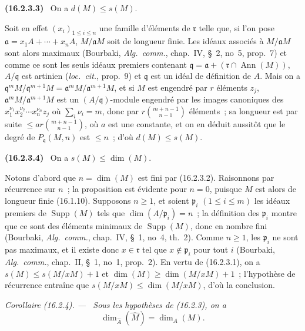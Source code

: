 \documentclass[10pt,oneside]{book}
\makeatletter
\newcommand{\setmanualcurrentlabel}[1]{\def\@currentlabel{#1}}
\newenvironment{env}[1][]{\setmanualcurrentlabel{#1}\par\medskip\noindent\textbf{(#1)}\ }{\par}
\newenvironment{corollary}[1][]{%
  \setmanualcurrentlabel{#1}\par\medskip\noindent\itshape Corollaire (#1). ---\ }{\par}
\makeatother
\begin{document}
\begin{env}[16.2.3.3]
\label{0.16.2.3.3-fr}
On a $d(M)\leq s(M)$.
\end{env}

Soit en effet $(x_i)_{1\leq i\leq n}$ une famille d'éléments de
$\mathfrak{r}$ telle que, si l'on pose
$\mathfrak{a}=x_1A+\cdots+x_nA$, $M/\mathfrak{a}M$ soit de longueur finie.
Les idéaux associés à $M/\mathfrak{a}M$ sont alors maximaux (Bourbaki,
\emph{Alg.~comm.}, chap.~IV, \S~2, no~5, prop.~7) et comme ce sont les seuls
idéaux premiers contenant
$\mathfrak{q}=\mathfrak{a}+(\mathfrak{r}\cap\operatorname{Ann}(M))$,
$A/\mathfrak{q}$ est artinien (\emph{loc.~cit.}, prop.~9) et $\mathfrak{q}$
est un idéal de définition de $A$. Mais on a
$\mathfrak{q}^mM/\mathfrak{q}^{m+1}M=
\mathfrak{a}^mM/\mathfrak{a}^{m+1}M$, et si $M$ est engendré par $r$ éléments
$z_j$, $\mathfrak{a}^mM/\mathfrak{a}^{m+1}M$ est un $(A/\mathfrak{q})$-module
engendré par les images canoniques des
$x_1^{\nu_1}x_2^{\nu_2}\cdots x_n^{\nu_n}z_j$ où
$\sum_i\nu_i=m$, donc par $r\binom{m+n-1}{n-1}$ éléments~; sa longueur est
par suite $\leq ar\binom{m+n-1}{n-1}$, où $a$ est une constante, et on en
déduit aussitôt que le degré de $P_{\mathfrak{q}}(M,n)$ est $\leq n$~; d'où
$d(M)\leq s(M)$.

\begin{env}[16.2.3.4]
\label{0.16.2.3.4-fr}
On a $s(M)\leq\dim(M)$.
\end{env}

Notons d'abord que $n=\dim(M)$ est fini par (16.2.3.2). Raisonnons par
récurrence sur $n$~; la proposition est évidente pour $n=0$, puisque $M$ est
alors de longueur finie (16.1.10). Supposons $n\geq1$, et soient
$\mathfrak{p}_i$ $(1\leq i\leq m)$ les idéaux premiers de
$\operatorname{Supp}(M)$ tels que $\dim(A/\mathfrak{p}_i)=n$~; la définition
des $\mathfrak{p}_i$ montre que ce sont des éléments minimaux de
$\operatorname{Supp}(M)$, donc en nombre fini (Bourbaki, \emph{Alg.~comm.},
chap.~IV, \S~1, no~4, th.~2). Comme $n\geq1$, les $\mathfrak{p}_i$ ne sont pas
maximaux, et il existe donc $x\in\mathfrak{r}$ tel que
$x\notin\mathfrak{p}_i$ pour tout $i$ (Bourbaki, \emph{Alg.~comm.}, chap.~II,
\S~1, no~1, prop.~2). En vertu de (16.2.3.1), on a
$s(M)\leq s(M/xM)+1$ et $\dim(M)\geq\dim(M/xM)+1$~; l'hypothèse de récurrence
entraîne que $s(M/xM)\leq\dim(M/xM)$, d'où la conclusion.

\begin{corollary}[16.2.4]
\label{0.16.2.4-fr}
Sous les hypothèses de (16.2.3), on a
\begin{equation}
\label{0.16.2.4.1-fr}
\tag{16.2.4.1}
  \dim_{\widehat{A}}(\widehat{M})=\dim_A(M).
\end{equation}
\end{corollary}
\end{document}

